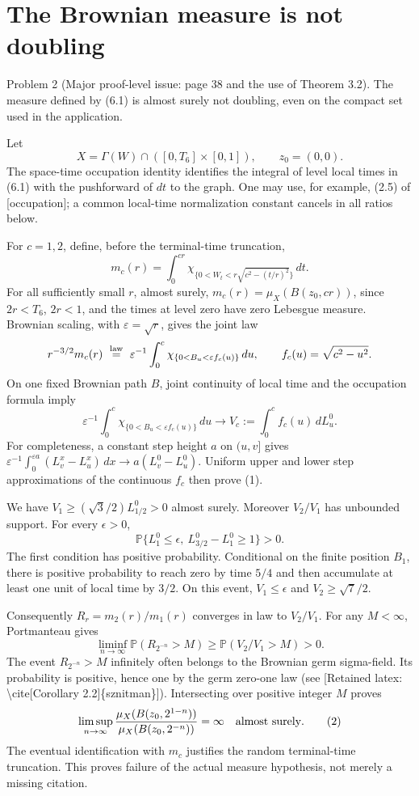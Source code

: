 \documentclass[10pt]{article}
\begin{document}
\section*{The Brownian measure is not doubling}
Problem 2 (Major proof-level issue: page 38 and the use of Theorem 3.2).  The measure defined by (6.1) is almost surely not doubling, even on the compact set used in the application.\par
Let \[X=\Gamma(W)\cap([0,T_6]\times[0,1]),\qquad z_0=(0,0).\] The space-time occupation identity identifies the integral of level local times in (6.1) with the pushforward of \(dt\) to the graph. One may use, for example, (2.5) of [occupation]; a common local-time normalization constant cancels in all ratios below.\par
For \(c=1,2\), define, before the terminal-time truncation, \[m_c(r)=\int_0^{cr}
 \chi_{\{0<W_t<r\sqrt{c^2-(t/r)^2}\}}\,dt .\] For all sufficiently small \(r\), almost surely, \(m_c(r)=\mu_X(B(z_0,cr))\), since \(2r<T_6\), \(2r<1\), and the times at level zero have zero Lebesgue measure. Brownian scaling, with \(\varepsilon=\sqrt r\), gives the joint law \[r^{-3/2}m_c(r)\ \stackrel{\rm law}{=}\
 \varepsilon^{-1}\int_0^c
 \chi_{\{0<B_u<\varepsilon f_c(u)\}}\,du,
 \qquad f_c(u)=\sqrt{c^2-u^2}.\] On one fixed Brownian path \(B\), joint continuity of local time and the occupation formula imply \[\varepsilon^{-1}\int_0^c
 \chi_{\{0<B_u<\varepsilon f_c(u)\}}\,du
 \longrightarrow V_c:=\int_0^c f_c(u)\,dL_u^0 .
 \tag{1}\] For completeness, a constant step height \(a\) on \((u,v]\) gives \(\varepsilon^{-1}\int_0^{\varepsilon a}
(L_v^x-L_u^x)\,dx\to a(L_v^0-L_u^0)\). Uniform upper and lower step approximations of the continuous \(f_c\) then prove (1).\par
We have \(V_1\ge(\sqrt3/2)L_{1/2}^0>0\) almost surely. Moreover \(V_2/V_1\) has unbounded support. For every \(\epsilon>0\), \[\mathbb P\{L_1^0\le\epsilon,\ L_{3/2}^0-L_1^0\ge1\}>0.\] The first condition has positive probability. Conditional on the finite position \(B_1\), there is positive probability to reach zero by time \(5/4\) and then accumulate at least one unit of local time by \(3/2\). On this event, \(V_1\le\epsilon\) and \(V_2\ge\sqrt7/2\).\par
Consequently \(R_r=m_2(r)/m_1(r)\) converges in law to \(V_2/V_1\). For any \(M<\infty\), Portmanteau gives \[\liminf_{n\to\infty}\mathbb P(R_{2^{-n}}>M)
 \ge \mathbb P(V_2/V_1>M)>0.\] The event \(R_{2^{-n}}>M\) infinitely often belongs to the Brownian germ sigma-field. Its probability is positive, hence one by the germ zero-one law (see [Retained latex: \textbackslash{}cite[Corollary 2.2]\{sznitman\}]). Intersecting over positive integer \(M\) proves \[\limsup_{n\to\infty}
 \frac{\mu_X(B(z_0,2^{1-n}))}
      {\mu_X(B(z_0,2^{-n}))}=\infty
 \quad\hbox{almost surely}.
 \tag{2}\] The eventual identification with \(m_c\) justifies the random terminal-time truncation. This proves failure of the actual measure hypothesis, not merely a missing citation.\par
\end{document}

